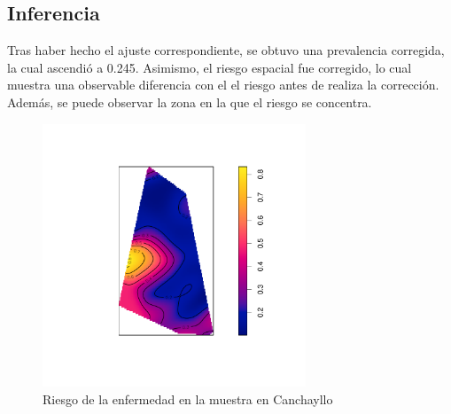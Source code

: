 \subsection*{Inferencia}

Tras haber hecho el ajuste correspondiente, se obtuvo una prevalencia corregida, la cual ascendió a 0.245. Asimismo, el riesgo espacial fue corregido, lo cual muestra una observable diferencia con el el riesgo antes de realiza la corrección. Además, se puede observar la zona en la que el riesgo se concentra.

\begin{figure}[h]
	\centering
	\includegraphics[width=0.7\textwidth]{graficos/canchayllo_risk_to_disease_fixed.pdf}
	\caption{Riesgo de la enfermedad en la muestra en Canchayllo}
	\label{canchayllo_risk_to_disease_fixed}
\end{figure}
